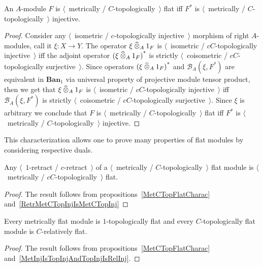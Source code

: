 \begin{proposition}\label{MetCTopFlatCharac}
An $A$-module $F$ is
$\langle$~metrically / $C$-topologically~$\rangle$ flat iff $F^*$ is
$\langle$~metrically / $C$-topologically~$\rangle$ injective.
\end{proposition}
\begin{proof} Consider any $\langle$~isometric / $c$-topologically
injective~$\rangle$ morphism of right $A$-modules, call it $\xi:X\to Y$. The
operator $\xi\mathbin{\widehat{\otimes}}_{A} 1_F$ is $\langle$~isometric / $c C$-topologically
injective~$\rangle$ iff the adjoint operator ${(\xi\mathbin{\widehat{\otimes}}_{A} 1_F)}^*$ is
strictly $\langle$~coisometric / $c C$-topologically surjective~$\rangle$. 
Since operators ${(\xi\mathbin{\widehat{\otimes}}_{A} 1_F)}^*$ and $\mathcal{B}_A(\xi,F^*)$ 
are equivalent in $\mathbf{Ban}_1$ via universal property of projective module 
tensor product, then we get that $\xi\mathbin{\widehat{\otimes}}_{A} 1_F$ 
is $\langle$~isometric / $c C$-topologically injective~$\rangle$ 
iff $\mathcal{B}_A(\xi,F^*)$ is 
strictly $\langle$~coisometric / $c C$-topologically surjective~$\rangle$. 
Since $\xi$ is arbitrary we conclude that $F$ 
is $\langle$~metrically / $C$-topologically~$\rangle$ flat iff
$F^*$ is $\langle$~metrically / $C$-topologically~$\rangle$ injective.
\end{proof}

This characterization allows one to prove many properties of flat modules by 
considering respective duals.

\begin{proposition}\label{RetrMetCTopFlatIsMetCTopFlat} 
Any $\langle$~$1$-retract / $c$-retract~$\rangle$ of a
$\langle$~metrically / $C$-topologically~$\rangle$ flat module is 
$\langle$~metrically / $cC$-topologically~$\rangle$ flat.
\end{proposition}
\begin{proof} The result follows from propositions~\ref{MetCTopFlatCharac} 
and~\ref{RetrMetCTopInjIsMetCTopInj}
\end{proof}

\begin{proposition}\label{MetFlatIsTopFlatAndTopFlatIsRelFlat} Every metrically
flat module is $1$-topologically flat and every $C$-topologically flat module is
$C$-relatively flat.
\end{proposition}
\begin{proof} The result follows from propositions~\ref{MetCTopFlatCharac} 
and~\ref{MetInjIsTopInjAndTopInjIsRelInj}.
\end{proof}

